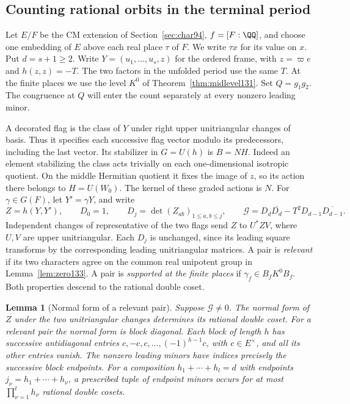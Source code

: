 \documentclass[a4paper,11pt]{article}
\newtheorem{lemma}[proposition]{Lemma}
\theoremstyle{definition}
\theoremstyle{remark}
\numberwithin{equation}{section}
\begin{document}
\subsection{Counting rational orbits in the terminal period}\label{nav:VIII-14}
\label{sec:orbits203}

Let \(E/F\) be the CM extension of Section~\ref{sec:char94},
\(f=[F:\QQ]\), and choose one embedding of \(E\) above each real
place \(\tau\) of \(F\). We write \(\tau x\) for its value on \(x\).
Put \(d=s+1\ge2\). Write \(Y=(u_1,\ldots,u_s,z)\) for the ordered
frame, with \(z=\varpi e\) and \(h(z,z)=-T\). The two factors in the
unfolded period use the same \(T\). At the finite places we use
the level \(K^0\) of Theorem~\ref{thm:midlevel131}. Set
\(Q=g_1g_2\). The congruence at \(Q\) will enter the count separately
at every nonzero leading minor.

A decorated flag is the class of \(Y\) under right upper
unitriangular changes of basis. Thus it specifies each successive
flag vector modulo its predecessors, including the last vector.
Its stabilizer in \(G=U(h)\) is \(B=NH\). Indeed an element
stabilizing the class acts trivially on each one-dimensional
isotropic quotient. On the middle Hermitian quotient it fixes the
image of \(z\), so its action there belongs to \(H=U(W_0)\).
The kernel of these graded actions is \(N\).
For \(\gamma\in G(F)\), let \(Y'=\gamma Y\), and write
\[
 Z=h(Y,Y'),\qquad D_0=1,\qquad
 D_j=\det(Z_{ab})_{1\le a,b\le j},\qquad
 \mathcal G=D_d\overline{D_d}-T^2D_{d-1}\overline{D_{d-1}} .
\]
Independent changes of representative of the two flags send \(Z\)
to \(U^*ZV\), where \(U,V\) are upper unitriangular. Each \(D_j\)
is unchanged, since its leading square transforms by the corresponding
leading unitriangular matrices. A pair is \emph{relevant} if its two
characters agree on the common real unipotent group in
Lemma~\ref{lem:zero133}. A pair is \emph{supported at the finite
places} if \(\gamma_f\in B_fK^0B_f\). Both properties descend to the
rational double coset.

\begin{lemma}[Normal form of a relevant pair]\label{lem:forms203}
Suppose \(\mathcal G\ne0\). The normal form of \(Z\) under the two
unitriangular changes determines its rational double coset. For a
relevant pair the normal form is block diagonal. Each block of
length \(h\) has successive antidiagonal entries
\(c,-c,c,\ldots,(-1)^{h-1}c\), with \(c\in E^\times\), and all its
other entries vanish. The nonzero leading minors have indices
precisely the successive block endpoints. For a composition
\(h_1+\cdots+h_l=d\) with endpoints \(j_\nu=h_1+\cdots+h_\nu\),
a prescribed tuple of endpoint minors occurs for at most
\(\prod_{\nu=1}^l h_\nu\) rational double cosets.
\end{lemma}
\end{document}
